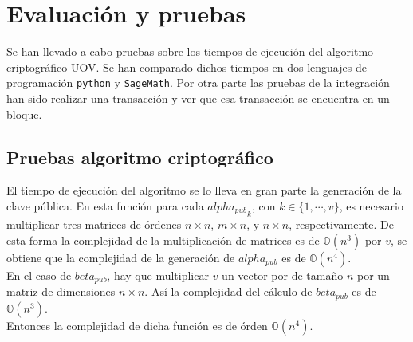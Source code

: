 \chapter{Evaluación y pruebas}


Se han llevado a cabo pruebas sobre los tiempos de ejecución del algoritmo criptográfico UOV. Se han comparado dichos tiempos en dos lenguajes de programación \texttt{python} y \texttt{SageMath}. Por otra parte las pruebas de la integración han sido realizar una transacción y ver que esa transacción se encuentra en un bloque.\\


\section{Pruebas algoritmo criptográfico}

El tiempo de ejecución del algoritmo se lo lleva en gran parte la generación de la clave pública. En esta función para cada ${alpha_{pub}}_k$, con $k \in \{1,\cdots, v\}$, es necesario multiplicar tres matrices de órdenes $n \times n$, $m \times n$, y $n \times n$, respectivamente. De esta forma la complejidad de la multiplicación de matrices es de $\mathds{O}(n^3)$ por $v$, se obtiene que la complejidad de la generación de $alpha_{pub}$ es de $\mathds{O}(n^4)$.\\

En el caso de $beta_{pub}$, hay que multiplicar $v$ un vector por de tamaño $n$ por un matriz de dimensiones $n \times n$. Así la complejidad del cálculo de $beta_{pub}$ es de $\mathds{O}(n^3)$.\\

Entonces la complejidad de dicha función es de órden $\mathds{O}(n^4)$.\\

